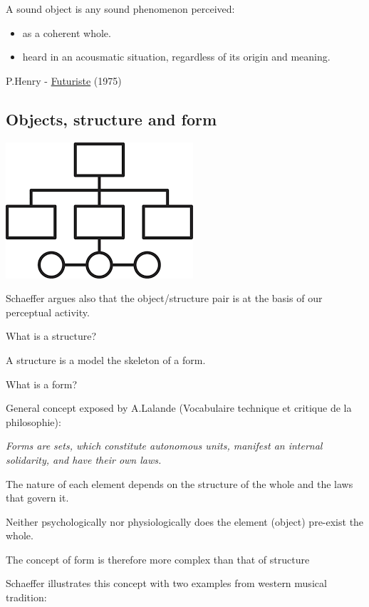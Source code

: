 A sound object is any sound phenomenon perceived:

\begin{itemize}
\tightlist
\item as a coherent whole.
\item heard in an acousmatic situation, regardless of its origin and meaning.
\end{itemize}

P.Henry - \href{https://github.com/musicaecodice/EMC/blob/main/3_fixed/suoni/henry.mp3}{Futuriste} (1975)

\subsection{Objects, structure and form }\label{objects-structure-and-form}

\begin{center}
\includegraphics[scale=0.3]{../img/struc.png}
\end{center}

Schaeffer argues also that the object/structure pair is at the basis of our perceptual activity.

What is a structure?

A structure is a model the skeleton of a form.

What is a form?

General concept exposed by A.Lalande (Vocabulaire technique et critique de la philosophie):

\textit{Forms are sets, which constitute autonomous units, manifest an internal solidarity, and have their own laws.}

The nature of each element depends on the structure of the whole and the laws that govern it.

Neither psychologically nor physiologically does the element (object) pre-exist the whole.

The concept of form is therefore more complex than that of structure

Schaeffer illustrates this concept with two examples from western musical tradition:

